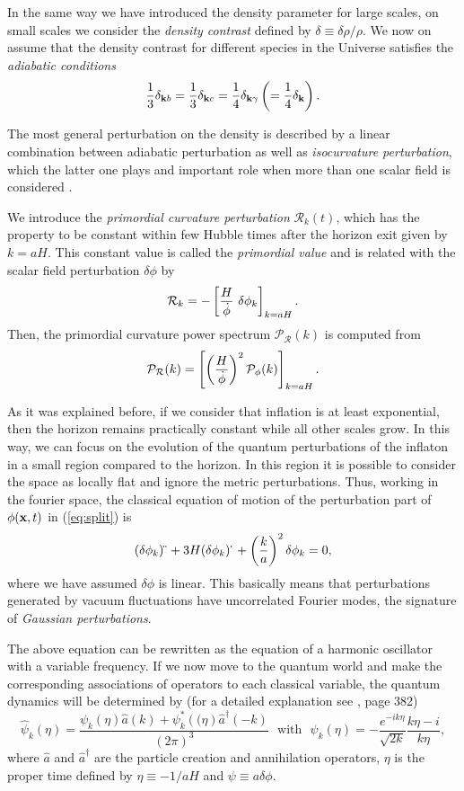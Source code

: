 \documentclass{rmaa}
\def\beq{\begin{equation}}
\def\eeq{\end{equation}}
\def\cal{\mathcal}
\begin{document}
In the same way we have introduced the density parameter for large scales, on small scales
we consider the \textit{density contrast} defined by $\delta \equiv \delta \rho / \rho$.
We now on assume that the density contrast for different species in the Universe satisfies the 
\textit{adiabatic conditions}
 \beq
 {1 \over 3}\delta_{{\bf k} b}={1 \over 3}\delta_{{\bf k} c}={1 \over 4}\delta_{{\bf k} \gamma}
 \left(={1 \over 4}\delta_{{\bf k} }\right).
 \eeq 

\noindent
The most general perturbation on the density is described by a linear combination between adiabatic
perturbation as well as \textit{isocurvature perturbation}, which the latter one plays and important role 
when more than one scalar field is considered  \citep{LiddleLyth}.


We introduce the \textit{primordial curvature perturbation} $\mathcal{R}_k(t)$, which has the property 
to be constant within few Hubble times after the horizon exit given by $k=aH$.  
This constant value is called the
\textit{primordial value} and is related with the scalar field perturbation $\delta \phi$ by
\beq
\mathcal{R}_k=-\left[ {H \over \dot \phi}\,\, \delta \phi_k \right]_{k=aH}.
\eeq
%
\noindent
 Then, the  primordial curvature power spectrum $\cal P_{\cal R}(k)$ is computed from
 \beq\label{eq:Pk1}
 \cal P_{\cal R}(k)=\left[\left({H \over \dot \phi} \right)^2 \cal P_{\phi}(k) \right]_{k=aH}.
 \eeq
 
 \noindent
 As it was explained before, if we consider that inflation is at least exponential, 
 then the horizon remains practically constant while all other scales grow. In this way, 
 we can focus on the evolution of the quantum perturbations of the inflaton in a small 
 region compared to the horizon. In this region it is possible to consider the space as 
 locally flat and ignore the metric perturbations. Thus, working in the fourier space, the 
 classical equation of motion of the perturbation part of $\phi({\bf x},t)$ in (\ref{eq:split}) is
\beq
(\delta \phi_k)\ddot \,\,+3 H (\delta \phi_k)\dot \,\,+\left({k \over a}\right)^2 \delta \phi_k=0,
\eeq
%
where we have assumed $\delta \phi$ is linear. This basically means that perturbations generated by
vacuum fluctuations have uncorrelated Fourier modes, the signature of \textit{Gaussian perturbations}. 
%

The above equation can be rewritten as the equation of a harmonic oscillator 
with a variable frequency. If we now move to the quantum world and make the corresponding 
associations of operators to each classical variable, the quantum dynamics will be determined 
by (for a detailed explanation see \citep{LiddleLyth2}, page 382)
\begin{equation}\label{qscalarfield}
\hat{\psi}_k\left(\eta\right)=\frac{\psi_k\left(\eta\right)\hat{a}\left(k\right)+\psi^*_k\left((\eta\right)\hat{a}^\dagger\left(-k\right)}{\left(2\pi\right)^3} \ \ \ \text{with} \ \ \ \psi_k\left(\eta\right)=-\frac{e^{-ik\eta}}{\sqrt{2k}}\frac{k\eta-i}{k\eta},
\end{equation}
where $\hat{a}$ and $\hat{a}^\dagger$ are the particle creation and annihilation 
operators, $\eta$ is the proper time defined by $\eta\equiv -1/aH$ and $\psi\equiv a\delta\phi$.
\end{document}
